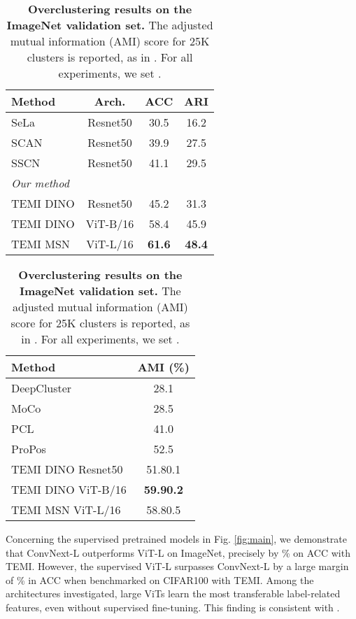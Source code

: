 \documentclass{bmvc2k}
\begin{document}
\begin{table}[htbp]
\begin{minipage}{.45\textwidth}
  \begin{tabular}{lccc}
    \toprule
    Method  & Arch.   & ACC &   ARI \\
    \hline
    SeLa \cite{sela} & Resnet50  & 30.5 &  16.2  \\
    SCAN \cite{scan} & Resnet50    & 39.9 & 27.5  \\
    SSCN \cite{sscn} & Resnet50    & 41.1  & 29.5 \\
    \midrule
     \multicolumn{4}{l}{\textit{Our method}}\\	
    TEMI DINO  & Resnet50    & 45.2  & 31.3 \\
    TEMI DINO & ViT-B/16     & 58.4  &  45.9 \\
    TEMI MSN   & ViT-L/16  & \textbf{61.6}  &  \textbf{48.4} \\
    \bottomrule
  \end{tabular}
  \newline \newline
\caption{\textbf{Clustering results for the ImageNet validation set, without using additional data.} Evaluation metrics include clustering accuracy (ACC), and adjusted random index (ARI) in \%. All our models are pretrained on ImageNet.}
\label{tab:in1k}
\end{minipage}
\hfill
\begin{minipage}{.45\textwidth}

\begin{tabular}{lc}
  \toprule
  Method      & AMI (\%)   \\
  \midrule
  DeepCluster~\cite{deepcluster}  & 28.1 \\
  MoCo~\cite{moco}        & 28.5 \\
  PCL~\cite{pcl}     & 41.0 \\
  ProPos~\cite{propos}     & 52.5 \\
  \midrule
  TEMI DINO Resnet50 & 51.80.1 \\
  TEMI DINO ViT-B/16 & \textbf{59.90.2} \\
  TEMI MSN ViT-L/16 & 58.80.5 \\
  \bottomrule
  \end{tabular}
  \newline \newline
  \caption{\textbf{Overclustering results on the ImageNet validation set.} The adjusted mutual information (AMI) score for 25K clusters is reported, as in \cite{pcl}. For all experiments, we set .}
  \label{tab:result_overclustering_in1k}
\end{minipage}
\end{table}
 Concerning the supervised pretrained models in Fig. \ref{fig:main}, we demonstrate that ConvNext-L outperforms ViT-L on ImageNet, precisely by \% on ACC with TEMI. However, the supervised ViT-L surpasses ConvNext-L by a large margin of \% in ACC when benchmarked on CIFAR100 with TEMI. Among the architectures investigated, large ViTs learn the most transferable label-related features, even without supervised fine-tuning. This finding is consistent with \cite{naseer2021intriguing}. 
\end{document}
